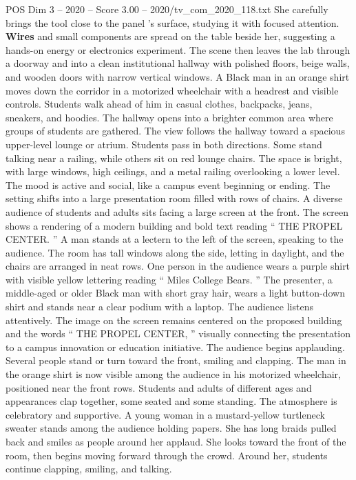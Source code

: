 \begin{textsample}{POS Dim 3 – 2020 – Score 3.00 – 2020/tv\_com\_2020\_118.txt}
She carefully brings the tool close to the panel ’s surface, studying it with focused attention. \textbf{Wires} and small components are spread on the table beside her, suggesting a hands-on energy or electronics experiment.
The scene then leaves the lab through a doorway and into a clean institutional hallway with polished floors, beige walls, and wooden doors with narrow vertical windows.
A Black man in an orange shirt moves down the corridor in a motorized wheelchair with a headrest and visible controls.
Students walk ahead of him in casual clothes, backpacks, jeans, sneakers, and hoodies.
The hallway opens into a brighter common area where groups of students are gathered.
The view follows the hallway toward a spacious upper-level lounge or atrium.
Students pass in both directions.
Some stand talking near a railing, while others sit on red lounge chairs.
The space is bright, with large windows, high ceilings, and a metal railing overlooking a lower level.
The mood is active and social, like a campus event beginning or ending.
The setting shifts into a large presentation room filled with rows of chairs.
A diverse audience of students and adults sits facing a large screen at the front.
The screen shows a rendering of a modern building and bold text reading “ THE PROPEL CENTER. ” A man stands at a lectern to the left of the screen, speaking to the audience.
The room has tall windows along the side, letting in daylight, and the chairs are arranged in neat rows.
One person in the audience wears a purple shirt with visible yellow lettering reading “ Miles College Bears. ” The presenter, a middle-aged or older Black man with short gray hair, wears a light button-down shirt and stands near a clear podium with a laptop.
The audience listens attentively.
The image on the screen remains centered on the proposed building and the words “ THE PROPEL CENTER, ” visually connecting the presentation to a campus innovation or education initiative.
The audience begins applauding.
Several people stand or turn toward the front, smiling and clapping.
The man in the orange shirt is now visible among the audience in his motorized wheelchair, positioned near the front rows.
Students and adults of different ages and appearances clap together, some seated and some standing.
The atmosphere is celebratory and supportive.
A young woman in a mustard-yellow turtleneck sweater stands among the audience holding papers.
She has long braids pulled back and smiles as people around her applaud.
She looks toward the front of the room, then begins moving forward through the crowd.
Around her, students continue clapping, smiling, and talking.

\end{textsample}
